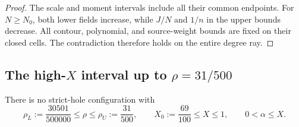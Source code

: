 \begin{proof}
The scale and moment intervals include all their common endpoints.
For $N\ge N_0$, both lower fields increase, while $J/N$ and
$1/n$ in the upper bounds decrease. All contour, polynomial,
and source-weight bounds are fixed on their closed cells.
The contradiction therefore holds on the entire degree ray.
\end{proof}

\subsection{The high-\texorpdfstring{$X$}{X} interval up to
\texorpdfstring{$\rho=31/500$}{rho=31/500}}

\begin{lemma}\label{sm:T-highX-extension}
There is no strict-hole configuration with
\[
 \rho_L:=\frac{30501}{500000}\le\rho\le
 \rho_U:=\frac{31}{500},\qquad
 X_0:=\frac{69}{100}\le X\le1,\qquad
 0<\alpha\le X .
\]
\end{lemma}
